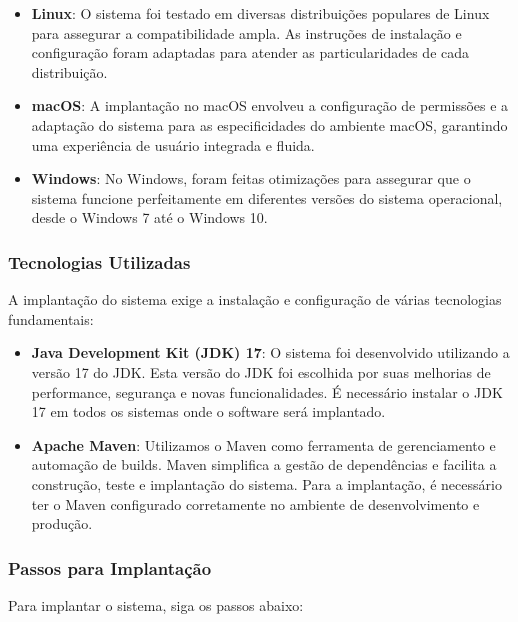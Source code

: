 \documentclass[../main.tex]{subfiles}
\begin{document}
\begin{itemize}
    \item \textbf{Linux}: O sistema foi testado em diversas distribuições populares de Linux para assegurar a compatibilidade ampla. As instruções de instalação e configuração foram adaptadas para atender as particularidades de cada distribuição.
    \item \textbf{macOS}: A implantação no macOS envolveu a configuração de permissões e a adaptação do sistema para as especificidades do ambiente macOS, garantindo uma experiência de usuário integrada e fluida.
    \item \textbf{Windows}: No Windows, foram feitas otimizações para assegurar que o sistema funcione perfeitamente em diferentes versões do sistema operacional, desde o Windows 7 até o Windows 10.
\end{itemize}

\subsubsection{Tecnologias Utilizadas}

A implantação do sistema exige a instalação e configuração de várias tecnologias fundamentais:

\begin{itemize}
    \item \textbf{Java Development Kit (JDK) 17}: O sistema foi desenvolvido utilizando a versão 17 do JDK. Esta versão do JDK foi escolhida por suas melhorias de performance, segurança e novas funcionalidades. É necessário instalar o JDK 17 em todos os sistemas onde o software será implantado.
    \item \textbf{Apache Maven}: Utilizamos o Maven como ferramenta de gerenciamento e automação de builds. Maven simplifica a gestão de dependências e facilita a construção, teste e implantação do sistema. Para a implantação, é necessário ter o Maven configurado corretamente no ambiente de desenvolvimento e produção.
\end{itemize}

\subsubsection{Passos para Implantação}

Para implantar o sistema, siga os passos abaixo:
\end{document}
